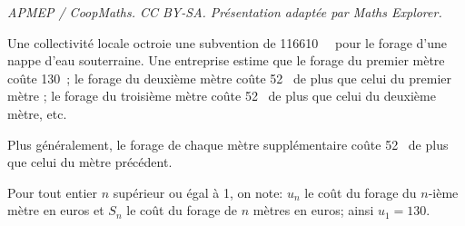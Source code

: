 \documentclass[10pt]{article}
\providecommand{\euro}{\texteuro}
\providecommand{\np}[2][]{{#2~#1}}
\providecommand{\euro}{{\text{€}}}
\renewcommand{\euro}{\ifmmode\text{\texteuro}\else\texteuro\fi}
\begin{document}
\noindent\textit{APMEP / CoopMaths. CC BY-SA. Présentation adaptée par Maths Explorer.}\par\medskip
\bigskip

Une collectivité locale octroie une subvention de \np{116610}~\euro{} pour le forage d'une nappe d'eau souterraine. Une entreprise estime que le forage du premier mètre coûte 130~\euro; le
forage du deuxième mètre coûte 52~\euro{} de plus que celui du premier mètre ; le forage du
troisième mètre coûte 52~\euro{} de plus que celui du deuxième mètre, etc.

Plus généralement, le forage de chaque mètre supplémentaire coûte 52~\euro{} de plus que celui
du mètre précédent.

Pour tout entier $n$ supérieur ou égal à 1, on note: $u_n$ le coût du forage du $n$-ième mètre en
euros et $S_n$ le coût du forage de $n$ mètres en euros; ainsi $u_1=130$.

\medskip
\end{document}
